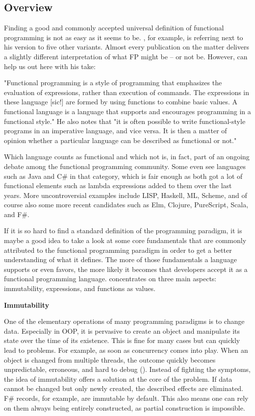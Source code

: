 \subsection{Overview}

Finding a good and commonly accepted universal definition of functional programming is not as easy as it seems to be. \cite[39]{alexander_functional_2017}, for example, is referring next to his version to five other variants. Almost every publication on the matter delivers a slightly different interpretation of what FP might be – or not be. However, \cite{hutton_frequently_2002} can help us out here with his take:

"Functional programming is a style of programming that emphasizes the evaluation of expressions, rather than execution of commands. The expressions in these language [sic!] are formed by using functions to combine basic values. A functional language is a language that supports and encourages programming in a functional style." He also notes that "it is often possible to write functional-style programs in an imperative language, and vice versa. It is then a matter of opinion whether a particular language can be described as functional or not."

Which language counts as functional and which not is, in fact, part of an ongoing debate among the functional programming community. Some even see languages such as Java and C\# in that category, which is fair enough as both got a lot of functional elements such as lambda expressions added to them over the last years. More uncontroversial examples include LISP, Haskell, ML, Scheme, and of course also some more recent candidates such as Elm, Clojure, PureScript, Scala, and F\#.

If it is so hard to find a standard definition of the programming paradigm, it is maybe a good idea to take a look at some core fundamentals that are commonly attributed to the functional programming paradigm in order to get a better understanding of what it defines. The more of those fundamentals a language supports or even favors, the more likely it becomes that developers accept it as a functional programming language. \cite[3]{abraham_get_2018} concentrates on three main aspects: immutability, expressions, and functions as values.

\textbf{Immutability}

One of the elementary operations of many programming paradigms is to change data. Especially in OOP, it is pervasive to create an object and manipulate its state over the time of its existence. This is fine for many cases but can quickly lead to problems. For example, as soon as concurrency comes into play. When an object is changed from multiple threads, the outcome quickly becomes unpredictable, erroneous, and hard to debug (\cite{bishop_checking_1996}). Instead of fighting the symptoms, the idea of immutability offers a solution at the core of the problem. If data cannot be changed but only newly created, the described effects are eliminated. F\# records, for example, are immutable by default. This also means one can rely on them always being entirely constructed, as partial construction is impossible.

